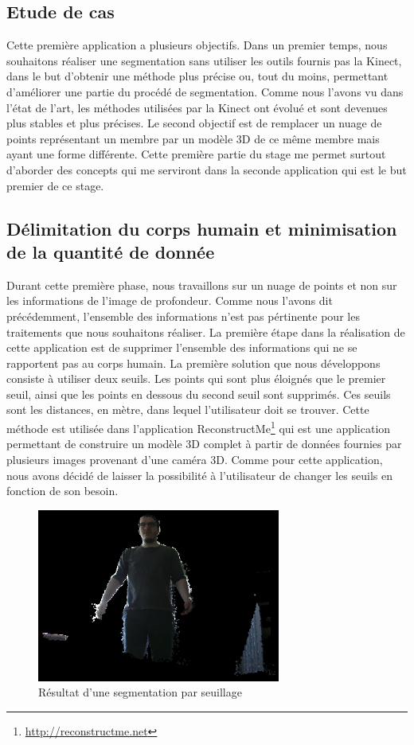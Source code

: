 \subsection{Etude de cas}
Cette première application a plusieurs objectifs. Dans un premier temps, nous souhaitons réaliser 
une segmentation sans utiliser les outils fournis pas la Kinect, dans le but d'obtenir une méthode plus
précise ou, tout du moins, permettant d'améliorer une partie du procédé de segmentation. Comme nous l'avons vu dans 
l'état de l'art, les méthodes utilisées par la Kinect ont évolué et sont devenues plus stables et plus précises.
Le second objectif est de remplacer un nuage de points représentant un membre par un modèle 3D de ce même membre
mais ayant une forme différente. Cette première partie du stage me permet surtout d'aborder des concepts qui me 
serviront dans la seconde application qui est le but premier de ce stage.

\subsection{Délimitation du corps humain et minimisation de la quantité de donnée}
Durant cette première phase, nous travaillons sur un nuage de points et non sur les informations de l'image de profondeur.
Comme nous l'avons dit précédemment, l'ensemble des informations n'est pas pértinente pour les traitements que nous souhaitons
réaliser. La première étape dans la réalisation de cette application est de supprimer l'ensemble des informations qui ne se rapportent pas 
au corps humain. La première solution que nous développons consiste à utiliser deux seuils. Les points qui sont plus éloignés que le 
premier seuil, ainsi que les points en dessous du second seuil sont supprimés. 
Ces seuils sont les distances, en mètre, dans lequel l'utilisateur doit se trouver. Cette méthode est utilisée dans 
l'application ReconstructMe\footnote{\url{http://reconstructme.net}} qui est une application permettant de construire un modèle
3D complet à partir de données fournies par plusieurs images provenant d'une caméra 3D. Comme pour cette application, nous avons
décidé de laisser la possibilité à l'utilisateur de changer les seuils en fonction de son besoin.\\

\begin{figure}[!ht]
  \begin{center}
    \includegraphics[width=8cm]{image/seuil1.PNG}
    \caption{Résultat d'une segmentation par seuillage}
    \label{fig:seuillage}
  \end{center}
\end{figure}

